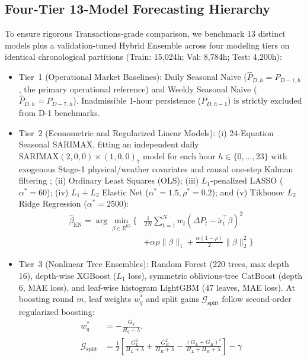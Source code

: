 \documentclass[runningheads,a4paper]{llncs}
\begin{document}
\subsection{Four-Tier 13-Model Forecasting Hierarchy}
To ensure rigorous Transactions-grade comparison, we benchmark 13 distinct models plus a validation-tuned Hybrid Ensemble across four modeling tiers on identical chronological partitions (Train: 15,024h; Val: 8,784h; Test: 4,200h):
\begin{itemize}
    \item Tier~1 (Operational Market Baselines): Daily Seasonal Naive ($\hat{P}_{D,h} = P_{D-1,h}$, the primary operational reference) and Weekly Seasonal Naive ($\hat{P}_{D,h} = P_{D-7,h}$). Inadmissible 1-hour persistence ($P_{D,h-1}$) is strictly excluded from D-1 benchmarks.
    \item Tier~2 (Econometric and Regularized Linear Models): (i) 24-Equation Seasonal SARIMAX, fitting an independent daily $\text{SARIMAX}(2,0,0)\times(1,0,0)_7$ model for each hour $h \in \{0,\dots,23\}$ with exogenous Stage-1 physical/weather covariates and causal one-step Kalman filtering \cite{ziel2018day}; (ii) Ordinary Least Squares (OLS); (iii) $L_1$-penalized LASSO ($\alpha^* = 60$); (iv) $L_1+L_2$ Elastic Net ($\alpha^* = 1.5, \rho^* = 0.2$); and (v) Tikhonov $L_2$ Ridge Regression ($\alpha^* = 2500$):
    \begin{equation}
    \begin{aligned}
    \hat{\beta}_{\text{EN}} = \arg\min_{\beta \in \mathbb{R}^{65}} \Big\{ & \frac{1}{2N}\sum_{t=1}^{N} w_t (\Delta P_t - \tilde{x}_t^\top \beta)^2 \\
    & + \alpha \rho \|\beta\|_1 + \frac{\alpha(1-\rho)}{2}\|\beta\|_2^2 \Big\}
    \end{aligned}
    \label{eq:elastic_net}
    \end{equation}
    \item Tier~3 (Nonlinear Tree Ensembles): Random Forest (220 trees, max depth 16), depth-wise XGBoost \cite{chen2016xgboost} ($L_1$ loss), symmetric oblivious-tree CatBoost \cite{prokhorenkova2018catboost} (depth 6, MAE loss), and leaf-wise histogram LightGBM \cite{ke2017lightgbm} (47 leaves, MAE loss). At boosting round $m$, leaf weights $w_q^*$ and split gains $\mathcal{G}_{\text{split}}$ follow second-order regularized boosting:
    \begin{equation}
    \begin{aligned}
    w_q^* &= -\frac{G_q}{H_q + \lambda}, \\
    \mathcal{G}_{\text{split}} &= \frac{1}{2}\left[\frac{G_L^2}{H_L+\lambda} + \frac{G_R^2}{H_R+\lambda} - \frac{(G_L+G_R)^2}{H_L+H_R+\lambda}\right] - \gamma

\end{aligned}
\end{equation}
\end{itemize}
\end{document}
